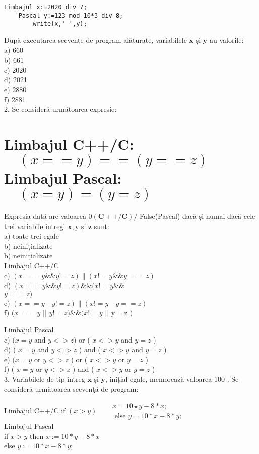 \begin{verbatim}
Limbajul x:=2020 div 7;
    Pascal y:=123 mod 10*3 div 8;
        write(x,' ',y);
\end{verbatim}

După executarea secvențe de program alăturate, variabilele $\mathbf{x}$ și $\mathbf{y}$ au valorile:\\
a) 660\\
b) 661\\
c) 2020\\
d) 2021\\
e) 2880\\
f) 2881\\
2. Se consideră următoarea expresie:

\section*{Limbajul C++/C: $\quad(x==y)==(y==z) \quad$ Limbajul Pascal: $\quad(x=y)=(y=z)$}
Expresia dată are valoarea $0(\mathbf{C}++/ \mathbf{C}) /$ False(Pascal) dacă și numai dacă cele trei variabile întregi $\mathbf{x}, \mathrm{y}$ și $\mathbf{z}$ sunt:\\
a) toate trei egale\\
b) neinițializate\\
b) neinițializate\\
Limbajul C++/C\\
c) $(x==y \& \& y!=z) \|(x!=y \& \& y==z)$\\
d) $(x==y \& \& y!=z) \& \&(x!=y \& \&$\\
$y==z)$\\
e) $(x==y \quad y!=z) \|(x!=y \quad y==z)$\\
f) $(x==y$ || $y!=z) \& \&(x!=y$ || $\mathrm{y}=\mathrm{z}$ )

Limbajul Pascal\\
c) $(x=y$ and $y<>z)$ or ( $x<>y$ and $y=z$ )\\
d) ( $x=y$ and $y<>z$ ) and ( $x<>y$ and $y=z$ )\\
e) $(x=y$ or $y<>z$ ) or ( $x<>y$ or $y=z$ )\\
f) ( $x=y$ or $y<>z$ ) and ( $x<>y$ or $y=z$ )\\
3. Variabilele de tip întreg $\mathbf{x}$ și $\mathbf{y}$, inițial egale, memorează valoarea 100 . Se consideră următoarea secvenţă de program:

\begin{displayquote}
Limbajul C++/C if $(x>y) \quad \begin{aligned} & x=10 \star y-8 * x ; \\ & \text { else } y=10 * x-8 * y ;\end{aligned}$\\
Limbajul Pascal\\
if $x>y$ then $x:=10 * y-8 * x$\\
else $y:=10 * x-8 * y$;
\end{displayquote}

